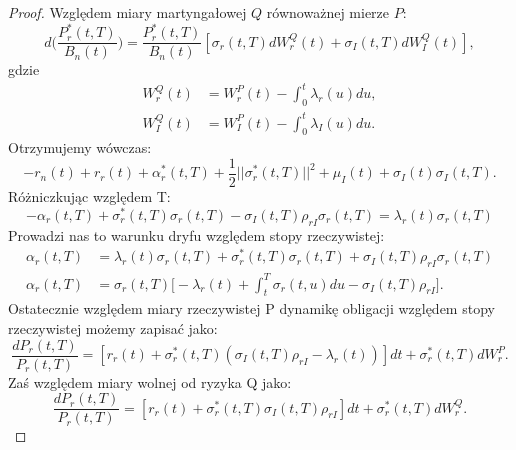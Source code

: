 \documentclass{mini}
\theoremstyle{mythstyle}
\begin{document}
\begin{proof}
	Względem miary martyngałowej $Q$ równoważnej mierze $P$:
	\begin{equation*}
	d\bigg(	\frac{P_r^*(t,T)}{B_n(t)}\bigg) = \frac{P_r^*(t,T)}{B_n(t)} [\sigma_r(t,T)dW_r^Q(t) + \sigma_I(t,T)dW_I^Q(t)],
	\end{equation*}
	gdzie
	\begin{align*}
	W_r^Q(t) &= W_r^P(t) - \int_{0}^{t} \lambda_r(u) du, \\
	W_I^Q(t) &= W_I^P(t) - \int_{0}^{t} \lambda_I(u) du.
	\end{align*}
	Otrzymujemy wówczas:
	\begin{equation}
	-r_n(t) + r_r(t) + \alpha_r^*(t,T) + \frac{1}{2} ||\sigma_r^*(t,T)||^2 + \mu_I(t) + \sigma_I(t)\sigma_I(t,T).
	\end{equation}
	Różniczkując względem T:
	\begin{equation}
	-\alpha_r(t,T) + \sigma_r^*(t,T)\sigma_r(t,T)-\sigma_I(t,T)\rho_{rI}\sigma_r(t,T) = \lambda_r(t)\sigma_r(t,T)
	\end{equation}
	Prowadzi nas to warunku dryfu względem stopy rzeczywistej:
	\begin{align*}
	\alpha_r(t,T) &= \lambda_r(t)\sigma_r(t,T) + \sigma_r^*(t,T)\sigma_r(t,T)+\sigma_I(t,T)\rho_{rI}\sigma_r(t,T) \\
	\alpha_r(t,T) &= \sigma_r(t,T)\bigg[ -\lambda_r(t) + \int_{t}^{T}\sigma_r(t,u) du - \sigma_I(t,T)\rho_{rI}\bigg].
	\end{align*}
	Ostatecznie względem miary rzeczywistej P dynamikę obligacji względem stopy rzeczywistej możemy zapisać jako:
	\begin{equation}
	\frac{dP_r(t,T)}{P_r(t,T)} = [r_r(t) +\sigma^*_r(t,T)(\sigma_I(t,T)\rho_{rI}-\lambda_r(t))]dt + \sigma^*_r(t,T)dW^P_r.
	\end{equation}
	Zaś względem miary wolnej od ryzyka Q jako:
	\begin{equation}
	\frac{dP_r(t,T)}{P_r(t,T)} = [r_r(t) +\sigma^*_r(t,T)\sigma_I(t,T)\rho_{rI}]dt + \sigma^*_r(t,T)dW^Q_r.
	\end{equation}

		\end{proof}
\end{document}
